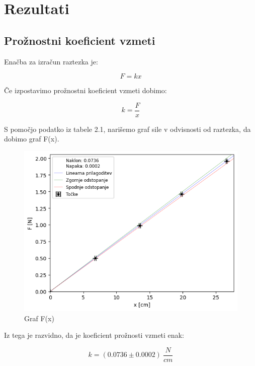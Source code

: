 \documentclass{report}
\begin{document}
\pagebreak

\section{Rezultati}

\subsection{Prožnostni koeficient vzmeti}

Enačba za izračun raztezka je:

\begin{equation}
  F = kx
\end{equation}

\noindent Če izpostavimo prožnostni koeficient vzmeti dobimo:

\begin{equation}
  k = \frac{F}{x}
\end{equation}

\noindent S pomočjo podatko iz tabele 2.1, narišemo graf sile v odvisnosti od raztezka,
da dobimo graf F(x).
  


\begin{figure}[H]
  \caption{Graf F(x)}
  \label{fig:graf}
  \includegraphics[width=\textwidth]{F(x)}
\end{figure}

Iz tega je razvidno, da je koeficient prožnosti vzmeti enak:

\begin{equation}
  k = (0.0736 \pm 0.0002) \ \frac{N}{cm}
\end{equation}
\end{document}
